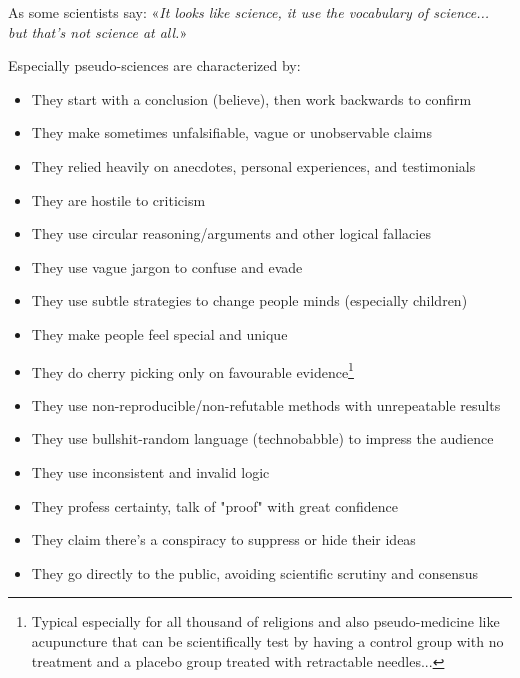 \begin{itemize}
	As some scientists say: «\textit{It looks like science, it use the vocabulary of science... but that's not science at all.}»
	
	Especially pseudo-sciences are characterized by:
	\begin{itemize}
		\item They start with a conclusion (believe), then work backwards to confirm

		\item They make sometimes unfalsifiable, vague or unobservable claims 
		
		\item They relied heavily on anecdotes, personal experiences, and testimonials
		
		\item They are hostile to criticism

		\item They use circular reasoning/arguments and other logical fallacies

		\item They use vague jargon to confuse and evade

		\item They use subtle strategies to change people minds (especially children)
		
		\item They make people feel special and unique

		\item They do cherry picking only on favourable evidence\footnote{Typical especially for all thousand of religions and also pseudo-medicine like acupuncture that can be scientifically test by having a control group with no treatment and a placebo group treated with retractable needles...}

		\item They use non-reproducible/non-refutable methods with unrepeatable results

		\item They use bullshit-random language (technobabble) to impress the audience

		\item They use inconsistent and invalid logic
		
		\item They profess certainty, talk of "proof" with great confidence
		
		\item They claim there's a conspiracy to suppress or hide their ideas
		
		\item They go directly to the public, avoiding scientific scrutiny and consensus


\end{itemize}
\end{itemize}
